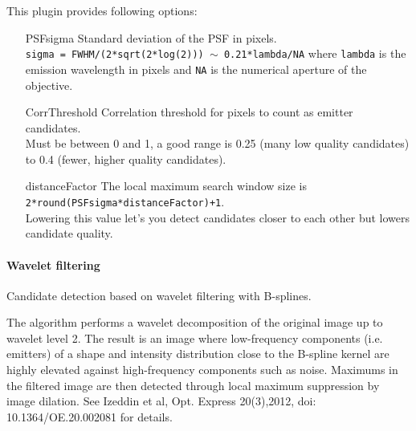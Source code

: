 \documentclass[11pt,onside]{report}
\numberwithin{equation}{chapter}
\begin{document}
This plugin provides following options:
\begin{itemize}[leftmargin=3cm]
	\item[\textsf{PSFsigma}] Standard deviation of the PSF in pixels.\\
	\texttt{sigma = FWHM/(2*sqrt(2*log(2))) $\sim$ 0.21*lambda/NA} where \texttt{lambda} is the emission wavelength in pixels and \texttt{NA} is the numerical aperture of the objective.
	\item[\textsf{CorrThreshold}] Correlation threshold for pixels to count as emitter candidates. \\
	Must be between 0 and 1, a good range is 0.25 (many low quality candidates) to 0.4 (fewer, higher quality candidates).
	\item[\textsf{distanceFactor}]The local maximum search window size is \texttt{2*round(PSFsigma*distanceFactor)+1}. \\
	Lowering this value let's you detect candidates closer to each other but lowers candidate quality.
\end{itemize}

\paragraph{Wavelet filtering}
Candidate detection based on wavelet filtering with B-splines.

The algorithm performs a wavelet decomposition of the original image up to wavelet level 2. The result is an image where low-frequency components (i.e. emitters) of a shape and intensity distribution close to the B-spline kernel are highly elevated against high-frequency components such as noise. Maximums in the filtered image are then detected through local maximum suppression by image dilation. See Izeddin et al, Opt. Express 20(3),2012, doi: 10.1364/OE.20.002081 for details.
\end{document}
